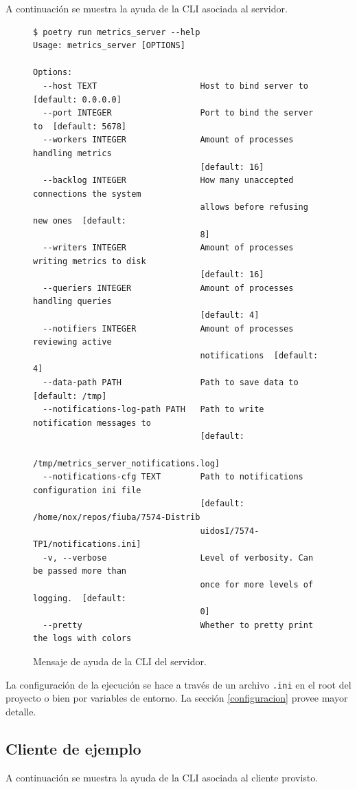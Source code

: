 \documentclass[titlepage,a4paper,oneside]{article}
\begin{document}
A continuación se muestra la ayuda de la CLI asociada al servidor.

\begin{figure}[H]
\begin{verbatim}
$ poetry run metrics_server --help
Usage: metrics_server [OPTIONS]

Options:
  --host TEXT                     Host to bind server to  [default: 0.0.0.0]
  --port INTEGER                  Port to bind the server to  [default: 5678]
  --workers INTEGER               Amount of processes handling metrics
                                  [default: 16]
  --backlog INTEGER               How many unaccepted connections the system
                                  allows before refusing new ones  [default:
                                  8]
  --writers INTEGER               Amount of processes writing metrics to disk
                                  [default: 16]
  --queriers INTEGER              Amount of processes handling queries
                                  [default: 4]
  --notifiers INTEGER             Amount of processes reviewing active
                                  notifications  [default: 4]
  --data-path PATH                Path to save data to  [default: /tmp]
  --notifications-log-path PATH   Path to write notification messages to
                                  [default:
                                  /tmp/metrics_server_notifications.log]
  --notifications-cfg TEXT        Path to notifications configuration ini file
                                  [default: /home/nox/repos/fiuba/7574-Distrib
                                  uidosI/7574-TP1/notifications.ini]
  -v, --verbose                   Level of verbosity. Can be passed more than
                                  once for more levels of logging.  [default:
                                  0]
  --pretty                        Whether to pretty print the logs with colors
\end{verbatim}
\caption{Mensaje de ayuda de la CLI del servidor.}
\end{figure}

La configuración de la ejecución se hace a través de un archivo \texttt{.ini} en el root del proyecto o bien por variables de entorno. La sección \ref{configuracion} provee mayor detalle.

\subsection{Cliente de ejemplo}
A continuación se muestra la ayuda de la CLI asociada al cliente provisto.
\end{document}

